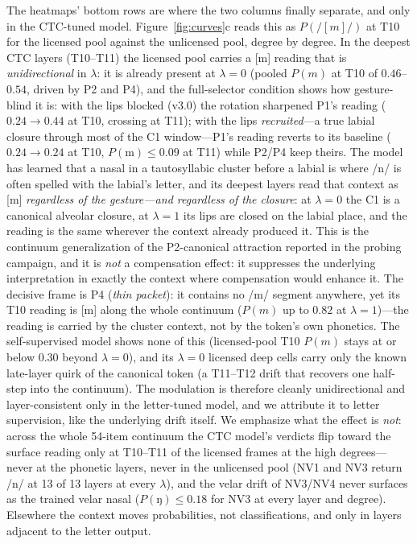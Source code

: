 \documentclass[11pt,a4paper]{article}
\newcommand{\lam}{\lambda}
\begin{document}
The heatmaps' bottom rows are where the two columns finally separate,
and only in the CTC-tuned model. Figure~\ref{fig:curves}c reads this
as $P(/[m]/)$ at T10 for the licensed pool against the unlicensed
pool, degree by degree. In the deepest CTC layers (T10--T11) the
licensed pool carries a [m] reading that is \emph{unidirectional} in
$\lam$: it is already present at $\lam=0$ (pooled $P(m)$ at T10 of
$0.46$--$0.54$, driven by P2 and P4), and the full-selector condition
shows how gesture-blind it is: with the lips blocked (v3.0) the
rotation sharpened P1's reading ($0.24 \to 0.44$ at T10, crossing at
T11); with the lips \emph{recruited}---a true labial closure through
most of the C1 window---P1's reading reverts to its baseline
($0.24 \to 0.24$ at T10, $P(\mathrm{m}) \leq 0.09$ at T11) while
P2/P4 keep theirs. The model has learned that a nasal in a
tautosyllabic cluster before a labial is where /n/ is often spelled
with the labial's letter, and its deepest layers read that context as
[m] \emph{regardless of the gesture---and regardless of the closure}:
at $\lam=0$ the C1 is a canonical alveolar closure, at $\lam=1$ its
lips are closed on the labial place, and the reading is the same
wherever the context already produced it. This is the continuum
generalization of the P2-canonical attraction reported in the probing
campaign, and it is \emph{not} a compensation effect: it suppresses
the underlying interpretation in exactly the context where
compensation would enhance it. The decisive frame is P4 (\emph{thin
packet}): it contains no /m/ segment anywhere, yet its T10 reading is
[m] along the whole continuum ($P(m)$ up to $0.82$ at $\lam=1$)---the
reading is carried by the cluster context, not by the token's own
phonetics. The self-supervised model shows none of this
(licensed-pool T10 $P(m)$ stays at or below $0.30$ beyond $\lam=0$),
and its $\lam=0$ licensed deep cells carry only the known late-layer
quirk of the canonical token (a T11--T12 drift that recovers one
half-step into the continuum). The modulation is therefore cleanly
unidirectional and layer-consistent only in the letter-tuned model,
and we attribute it to letter supervision, like the underlying drift
itself. We emphasize what the effect is \emph{not}: across the whole
54-item continuum the CTC model's verdicts flip toward the surface
reading only at T10--T11 of the licensed frames at the high
degrees---never at the phonetic layers, never in the unlicensed pool
(NV1 and NV3 return /n/ at 13 of 13 layers at every $\lam$), and the
velar drift of NV3/NV4 never surfaces as the trained velar nasal
($P(\text{ŋ}) \leq 0.18$ for NV3 at every layer and degree).
Elsewhere the context moves probabilities, not classifications, and
only in layers adjacent to the letter output.
\end{document}
